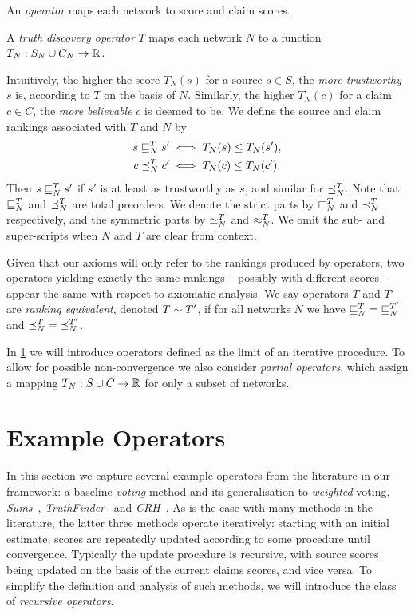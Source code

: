 An \emph{operator} maps each network to score and claim scores.

\begin{definition}
    A \emph{truth discovery operator} $T$ maps each network $N$ to a function
    $T_N: S_N \cup C_N \to \mathbb{R}$.
\end{definition}

Intuitively, the higher the score $T_N(s)$ for a source $s \in S$, the
\emph{more trustworthy} $s$ is, according to $T$ on the basis of $N$.
Similarly, the higher $T_N(c)$ for a claim $c \in C$, the \emph{more
believable} $c$ is deemed to be. We define the source and claim rankings
associated with $T$ and $N$ by
\begin{align*}
    s \sqsubseteq_N^T s' &\iff T_N(s) \le T_N(s'), \\
    c \preceq_N^T c' &\iff T_N(c) \le T_N(c').
\end{align*}
Then $s \sqsubseteq_N^T s'$ if $s'$ is at least as trustworthy as $s$, and similar for
$\preceq_N^T$. Note that $\sqsubseteq_N^T$ and $\preceq_N^T$ are total
preorders.\footnotemark{} We denote
the strict parts by $\sqsubset_N^T$ and $\prec_N^T$ respectively, and the symmetric
parts by $\simeq_N^T$ and $\approx_N^T$. We omit the sub- and super-scripts when
$N$ and $T$ are clear from context.


Given that our axioms will only refer to the rankings produced by operators,
two operators yielding exactly the same rankings -- possibly with different
scores -- appear the same with respect to axiomatic analysis. We say operators
$T$ and $T'$ are \emph{ranking equivalent}, denoted $T \sim T'$, if for
all networks $N$ we have ${\sqsubseteq_N^T} = {\sqsubseteq_N^{T'}}$ and ${\preceq_N^T} =
{\preceq_N^{T'}}$.

In \cref{td_new_sec_example_operators} we will introduce operators defined as
the limit of an iterative procedure. To allow for possible non-convergence we
also consider \emph{partial operators}, which assign a mapping $T_N: S \cup C
\to \mathbb{R}$ for only a subset of networks.

\section{Example Operators}
\label{td_new_sec_example_operators}

In this section we capture several example operators from the literature in our
framework: a baseline \emph{voting} method and its generalisation to
\emph{weighted} voting, \emph{Sums}~\cite{pasternack2010},
\emph{TruthFinder}~\cite{yin2008} and \emph{CRH}~\cite{li2016}. As is the case
with many methods in the literature, the latter three methods operate
iteratively: starting with an initial estimate, scores are repeatedly updated
according to some procedure until convergence. Typically the update procedure
is recursive, with source scores being updated on the basis of the current
claims scores, and vice versa.  To simplify the definition and analysis of such
methods, we will introduce the class of \emph{recursive operators}.

